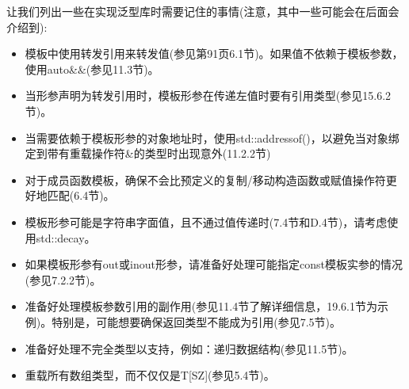 让我们列出一些在实现泛型库时需要记住的事情(注意，其中一些可能会在后面会介绍到):

\begin{itemize}
\item 
模板中使用转发引用来转发值(参见第91页6.1节)。如果值不依赖于模板参数，使用auto\&\&(参见11.3节)。

\item 
当形参声明为转发引用时，模板形参在传递左值时要有引用类型(参见15.6.2节)。

\item 
当需要依赖于模板形参的对象地址时，使用std::addressof()，以避免当对象绑定到带有重载操作符\&的类型时出现意外(11.2.2节)

\item 
对于成员函数模板，确保不会比预定义的复制/移动构造函数或赋值操作符更好地匹配(6.4节)。

\item 
模板形参可能是字符串字面值，且不通过值传递时(7.4节和D.4节)，请考虑使用std::decay。

\item 
如果模板形参有out或inout形参，请准备好处理可能指定const模板实参的情况(参见7.2.2节)。

\item 
准备好处理模板参数引用的副作用(参见11.4节了解详细信息，19.6.1节为示例)。特别是，可能想要确保返回类型不能成为引用(参见7.5节)。

\item 
准备好处理不完全类型以支持，例如：递归数据结构(参见11.5节)。

\item 
重载所有数组类型，而不仅仅是T[SZ](参见5.4节)。
\end{itemize}